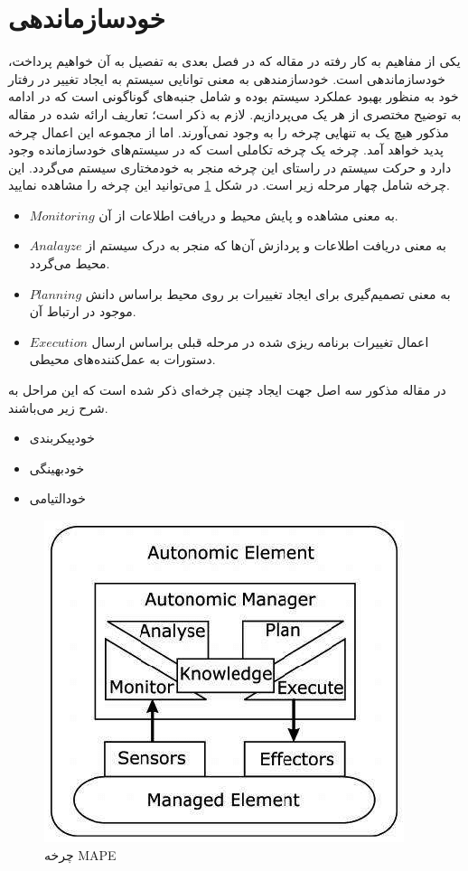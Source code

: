 \section{خودسازماندهی}
یکی از مفاهیم به کار رفته در مقاله \cite{} که در فصل بعدی به تفصیل به آن خواهیم پرداخت، خودسازماندهی است. خودسازمندهی به معنی توانایی سیستم به ایجاد تغییر در رفتار خود به منظور بهبود عملکرد سیستم بوده و شامل جنبه‌های گوناگونی است که در ادامه به توضیح مختصری از هر یک می‌پردازیم. لازم به ذکر است؛ تعاریف ارائه شده در مقاله مذکور هیچ یک به تنهایی چرخه  را به وجود نمی‌آورند. اما از مجموعه این اعمال چرخه پدید خواهد آمد. چرخه  یک چرخه تکاملی است که در سیستم‌های خودسازمانده وجود دارد و حرکت سیستم در راستای این چرخه منجر به خودمختاری سیستم می‌گردد. این چرخه شامل چهار مرحله زیر است. در شکل \ref{fig:mape} می‌توانید این چرخه را مشاهده نمایید. 
\begin{itemize}
	\item{$Monitoring$ به معنی مشاهده و پایش محیط و دریافت اطلاعات از آن.}
	\item{$Analayze$ به معنی دریافت اطلاعات و پردازش آن‌ها که منجر به درک سیستم از محیط می‌گردد.}
	\item{$Planning$ به معنی تصمیم‌گیری برای ایجاد تغییرات بر روی محیط براساس دانش موجود در ارتباط آن.}
	\item{$Execution$ اعمال تغییرات برنامه ریزی شده در مرحله قبلی براساس ارسال دستورات به عمل‌کننده‌های محیطی.}
\end{itemize}
\par
در مقاله مذکور سه اصل جهت ایجاد چنین چرخه‌ای ذکر شده است که این مراحل به شرح زیر ‌می‌باشند.
\begin{itemize}
	\item{خودپیکربندی}
	\item{خودبهینگی}
	\item{خودالتیامی}
\end{itemize}

\begin{figure}
	\centering
	\includegraphics[width=0.5\linewidth]{figs/mape}
	\caption {چرخه MAPE}
	\label{fig:mape}
\end{figure}

